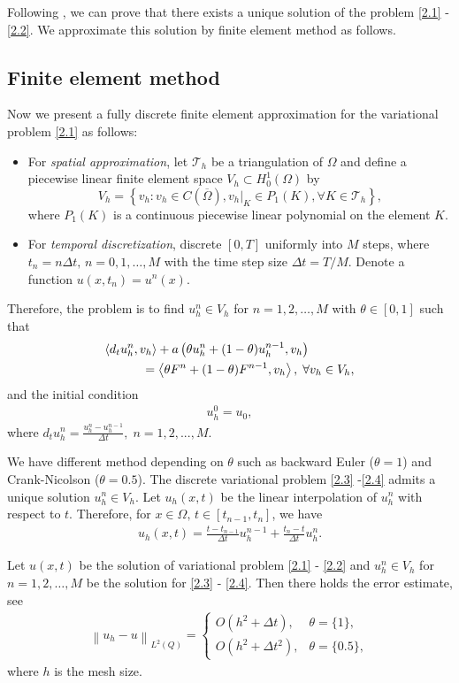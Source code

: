\documentclass[twocolumn]{article}
\begin{document}
Following \cite{C87, W87, L98, SV03}, we can prove that there exists a unique solution of the problem \eqref{2.1} - \eqref{2.2}. We approximate this solution by finite element method as follows. 
\subsection{Finite element method}
\quad Now we present a fully discrete finite element approximation for the variational problem \eqref{2.1} as follows:
\begin{itemize}
	\item For \textit{spatial approximation}, let $\mathcal{T}_h$ be a triangulation of $\Omega$ and define a piecewise linear finite element space $V_h \subset H^1_0(\Omega)$ by
	$$V_h=\left\{v_h:v_h\in C(\overline{\Omega}), v_h|_K\in P_1(K), \forall K\in \mathcal{T}_h\right\},$$
	where $P_1(K)$ is a continuous piecewise linear polynomial on the element $K$.
	\item For \textit{temporal discretization}, discrete $[0, T]$ uniformly into $M$ steps, where $t_n=n\Delta t,\, n=0, 1, \dots, M$ with the time step size $\Delta t = T/M$. Denote a function $u(x, t_n)=u^n(x)$.
\end{itemize}

Therefore, the problem is to find $u^n_h\in V_h$ for $n=1, 2, \dots, M$ with $\theta \in [0, 1]$ such that
\begin{align}\label{2.3}
	&\langle d_tu^n_h, v_h \rangle+a\left(\theta u^n_h+(1-\theta)u^{n-1}_h, v_h\right)\notag\\
	&\qquad\quad=\left\langle \theta F^n+(1-\theta)F^{n-1}, v_h \right\rangle, \; \forall v_h\in V_h,
\end{align}
and the initial condition 
\begin{align}\label{2.4}
	u^0_h=u_0,
\end{align}
where $d_tu^n_h=\frac{u^n_h-u^{n-1}_h}{\Delta t}, \; n=1, 2, ..., M$.

We have different method depending on $\theta$ such as backward Euler ($\theta=1$) and Crank-Nicolson ($\theta=0.5$). The discrete variational problem \eqref{2.3} -\eqref{2.4} admits a unique solution $u^n_h\in V_h$. Let $u_h(x, t)$ be the linear interpolation of $u_h^n$ with respect to $t$. Therefore, for $x\in \Omega,\, t\in [t_{n-1}, t_n]$, we have
\begin{align*}
	u_h(x, t)=\frac{t-t_{n-1}}{\Delta t}u_h^{n-1}+\frac{t_n-t}{\Delta t}u_h^{n}.
\end{align*}
\begin{dl}\label{dl2.1}
	Let $u(x, t)$ be the solution of variational problem \eqref{2.1} - \eqref{2.2} and $u^n_h\in V_h$ for $n=1, 2, \dots, M$ be the solution for \eqref{2.3} - \eqref{2.4}. Then there holds the error estimate, see \cite{C87}
	\begin{align}\label{2.5}
		\left\|u_h-u\right\|_{L^2(Q)}=
		\begin{cases}
			O\left(h^2+\Delta t\right), &\theta=\{1\},\\
			O\left(h^2+\Delta t^2\right), &\theta=\{0.5\},
		\end{cases}		
	\end{align}
	where $h$ is the mesh size.
\end{dl}

\end{document}
